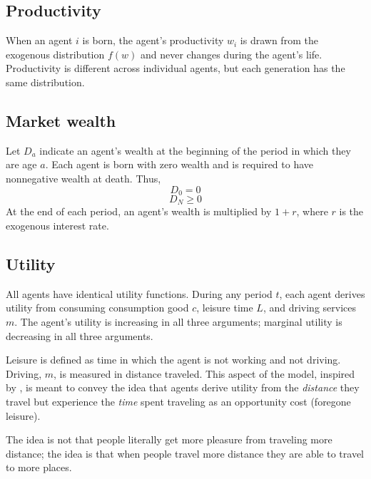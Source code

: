 \documentclass[letter, 12pt, epsf,leqno]{article}
\begin{document}
\subsection{Productivity}

When an agent $i$ is born, the agent's productivity $w_i$ is drawn from the exogenous distribution $f(w)$ and never changes during the agent's life.  Productivity is different across individual agents, but each generation has the same distribution.

\subsection{Market wealth}

Let $D_a$ indicate an agent's wealth at the beginning of the period in which they are age $a$.  Each agent is born with zero wealth and is required to have nonnegative wealth at death.  Thus,
\begin{equation}D_0=0\end{equation}
\begin{equation}D_N \ge 0\end{equation}
At the end of each period, an agent's wealth is multiplied by $1+r$, where $r$ is the exogenous interest rate.

\subsection{Utility}

All agents have identical utility functions.  During any period $t$, each agent derives utility from consuming consumption good $c$, leisure time $L$, and driving services $m$.  The agent's utility is increasing in all three arguments; marginal utility is decreasing in all three arguments.

Leisure is defined as time in which the agent is not working and not driving.  Driving, $m$, is measured in distance traveled.  This aspect of the model, inspired by \citet{wei}, is meant to convey the idea that agents derive utility from the \emph{distance} they travel but experience the \emph{time} spent traveling as an opportunity cost (foregone leisure).

The idea is not that people literally get more pleasure from traveling more distance; the idea is that when people travel more distance they are able to travel to more places.  

\end{document}
